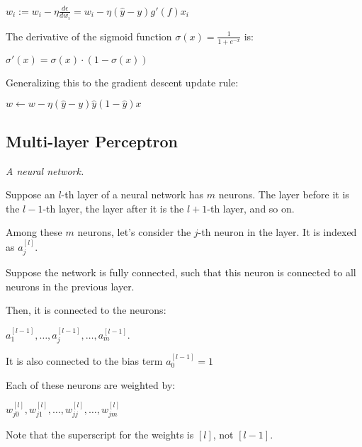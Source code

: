 $w_i := w_i - \eta \frac{d\epsilon}{dw_i} = w_i - \eta(\hat{y} - y) g'(f)x_i$

The derivative of the sigmoid function $\sigma(x) = \frac{1}{1 + e^{-x}}$ is:

$\sigma'(x) = \sigma(x) \cdot (1 - \sigma(x))$

Generalizing this to the gradient descent update rule:

$w \leftarrow w - \eta(\hat{y} - y) \hat{y} (1 - \hat{y}) x$

\subsection{Multi-layer Perceptron}
\emph{A neural network.}

Suppose an $l$-th layer of a neural network has $m$ neurons.
The layer before it is the $l - 1$-th layer, the layer after it is the $l + 1$-th layer, and so on.

Among these $m$ neurons, let's consider the $j$-th neuron in the layer.
It is indexed as $a_j^{[l]}$.

Suppose the network is fully connected, such that this neuron is connected to all
neurons in the previous layer.

Then, it is connected to the neurons:

$a_1^{[l-1]}, \dots, a_j^{[l-1]}, \dots, a_m^{[l-1]}$.

It is also connected to the bias term $a_0^{[l - 1]} = 1$

Each of these neurons are weighted by:

$w_{j0}^{[l]}, w_{j1}^{[l]}, \dots, w_{jj}^{[l]}, \dots,  w_{jm}^{[l]}$

Note that the superscript for the weights is $[l]$, not $[l-1]$.